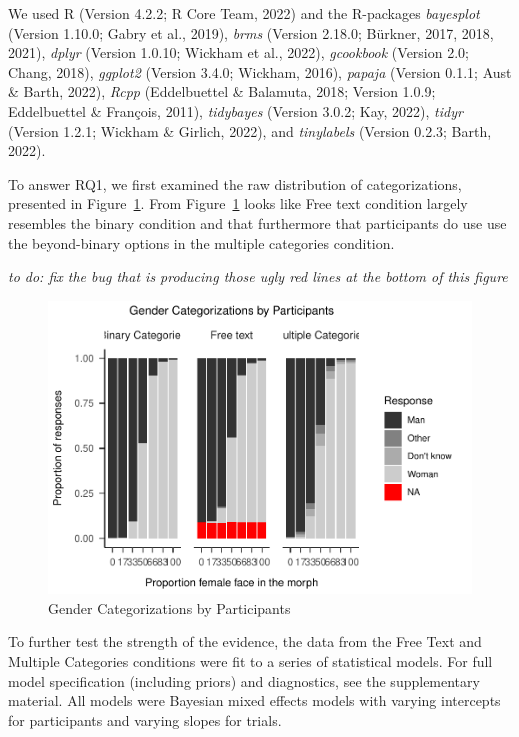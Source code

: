 \documentclass[
  man]{apa7}
\begin{document}
We used R (Version 4.2.2; R Core Team, 2022) and the R-packages \emph{bayesplot} (Version 1.10.0; Gabry et al., 2019), \emph{brms} (Version 2.18.0; Bürkner, 2017, 2018, 2021), \emph{dplyr} (Version 1.0.10; Wickham et al., 2022), \emph{gcookbook} (Version 2.0; Chang, 2018), \emph{ggplot2} (Version 3.4.0; Wickham, 2016), \emph{papaja} (Version 0.1.1; Aust \& Barth, 2022), \emph{Rcpp} (Eddelbuettel \& Balamuta, 2018; Version 1.0.9; Eddelbuettel \& François, 2011), \emph{tidybayes} (Version 3.0.2; Kay, 2022), \emph{tidyr} (Version 1.2.1; Wickham \& Girlich, 2022), and \emph{tinylabels} (Version 0.2.3; Barth, 2022).

To answer RQ1, we first examined the raw distribution of categorizations, presented in Figure~\ref{fig:descriptives}. From Figure~\ref{fig:descriptives} looks like Free text condition largely resembles the binary condition and that furthermore that participants do use use the beyond-binary options in the multiple categories condition.

\emph{to do: fix the bug that is producing those ugly red lines at the bottom of this figure}

\begin{figure}
\centering
\includegraphics{resp_opts_manus23022_files/figure-latex/descriptives-1.pdf}
\caption{\label{fig:descriptives}Gender Categorizations by Participants}
\end{figure}

To further test the strength of the evidence, the data from the Free Text and Multiple Categories conditions were fit to a series of statistical models. For full model specification (including priors) and diagnostics, see the supplementary material. All models were Bayesian mixed effects models with varying intercepts for participants and varying slopes for trials.
\end{document}

